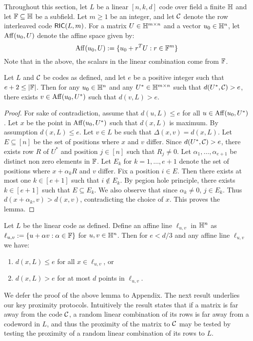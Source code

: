 Throughout this section, let $L$ be a linear $[n,k,d]$ code over field a finite $\mathbb{H}$ and let $\mathbb{F}\subseteq \mathbb{H}$ be a subfield.  Let $m\geq 1$ be an integer, and let $\mathcal{C}$ denote the row interleaved code $\mathsf{RIC}(L,m)$. For a matrix $U\in \mathbb{H}^{m\times n}$ and a vector $u_0\in \mathbb{H}^n$, let ${\rm Aff}({u_0},{U})$ denote the affine space given by:
\begin{equation}\label{eq:affspace}
{\rm Aff}({u_0},{U}) := \{u_0+r^TU: r\in \mathbb{F}^m\}
\end{equation}
Note that in the above, the scalars in the linear combination come from $\mathbb{F}$.

\begin{lemma}\label{lem:farpoint}
Let $L$ and $\mathcal{C}$ be codes as defined, and let $e$ be a positive integer such that $e+2\leq |\mathbb{F}|$. Then for any $u_0\in \mathbb{H}^n$ and any $U^\ast\in \mathbb{H}^{m\times n}$ such that $d(U^\ast,\mathcal{C})>e$, there exists $v\in {\rm Aff}({u_0},{U^\ast})$ such that $d(v,L)>e$.
\end{lemma} 
\begin{proof}
For sake of contradiction, assume that $d(u,L)\leq e$ for all $u\in
{\rm Aff}({u_0},{U^\ast})$. Let $x$ be the point in ${\rm Aff}({u_0},{U^\ast})$ such that
$d(x,L)$ is maximum. By assumption $d(x,L)\leq e$. Let $v\in L$ be such that
$\Delta(x,v)=d(x,L)$. Let $E\subseteq [n]$ be the set of positions where $x$ and
$v$ differ. Since $d(U^\ast,\mathcal{C})>e$, there exists row $R$ of $U^\ast$ and
position $j\in [n]$ 
such that $R_j\neq 0$. Let
$\alpha_1,\ldots,\alpha_{e+1}$ be distinct non zero elements in $\mathbb{F}$. Let $E_k$
for $k=1,\ldots,e+1$ denote the set of positions where $x+\alpha_kR$ and $v$
differ. Fix a position $i\in E$. Then there exists at most one $k\in [e+1]$ such
that $i\not\in E_k$. By pegion hole principle, there exists $k\in [e+1]$ such
that $E\subseteq E_k$. We also observe that since $\alpha_k\neq 0$, $j\in E_k$.
Thus $d(x+\alpha_k,v)>d(x,v)$, contradicting the choice of $x$. This proves the
lemma.   
\end{proof}


\begin{lemma}\label{lem:affineline}
Let $L$ be the linear code as defined. Define an affine line $\ell_{u,v}$ in $\mathbb{H}^n$ as $\ell_{u,v} := \{u + \alpha v:\alpha\in \mathbb{F}\}$ for $u,v\in \mathbb{H}^n$. Then for $e < d/3$ and any affine line $\ell_{u,v}$ we have:
\begin{enumerate}[{\rm (i)}]
\item $d(x,L)\leq e$ for all $x\in \ell_{u,v}$, or
\item $d(x,L)> e$ for at most $d$ points in $\ell_{u,v}$.
\end{enumerate}
\end{lemma}
We defer the proof of the above lemma to Appendix.
The next result underlies our key proximity protocols. Intuitively the result states that if a matrix is far away from the code $\mathcal{C}$, a random linear combination of its rows is far away from a codeword in $L$, and thus the proximity of the matrix to $\mathcal{C}$ may be tested by testing the proximity of a random linear combination of its rows to $L$.


